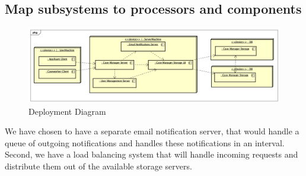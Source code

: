 \newpage
\subsection{Map subsystems to processors and components}
\begin{figure}[htb!]
    \centering
    \includegraphics[width=\textwidth]{img/pkg-deployment-diagram.png}
    \caption{Deployment Diagram}
\end{figure}

We have chosen to have a separate email notification server, that would handle a queue of outgoing notifications and handles these notifications in an interval.
Second, we have a load balancing system that will handle incoming requests and distribute them out of the available storage servers. 
